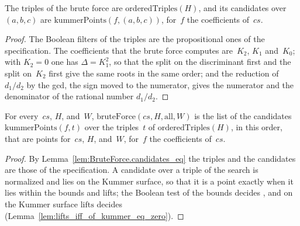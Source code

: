 \begin{lemma}
  \label{lem:BruteForce.candidates_eq}
  \leanok
  The triples of the brute force are $\mathrm{orderedTriples}(H)$, and its candidates over
  $(a, b, c)$ are $\mathrm{kummerPoints}(f, (a, b, c))$, for~$f$ the coefficients of~$cs$.
\end{lemma}

\begin{proof}\leanok
  The Boolean filters of the triples are the propositional ones of the specification. The
  coefficients that the brute force computes are~$K_2$, $K_1$ and~$K_0$; with $K_2 = 0$ one has
  $\Delta = K_1^2$, so that the split on the discriminant first and the split on~$K_2$ first give
  the same roots in the same order; and the reduction of $d_1/d_2$ by the gcd, the sign moved to
  the numerator, gives the numerator and the denominator of the rational number $d_1/d_2$.
\end{proof}

\begin{theorem}
  \label{thm:bruteForce_eq_filter_flatMap_kummerPoints}
  \leanok
  For every~$cs$, $H$,  and~$W$, $\mathrm{bruteForce}(cs, H, \mathrm{all}, W)$ is the
  list of the candidates $\mathrm{kummerPoints}(f, t)$ over the triples~$t$ of
  $\mathrm{orderedTriples}(H)$, in this order, that are points for~$cs$, $H$, 
  and~$W$, for~$f$ the coefficients of~$cs$.
\end{theorem}

\begin{proof}\leanok
  By Lemma~\ref{lem:BruteForce.candidates_eq} the triples and the candidates are those of the
  specification. A candidate over a triple of the search is normalized and lies on the Kummer
  surface, so that it is a point exactly when it lies within the bounds and lifts; the Boolean
  test of the bounds decides , and on the Kummer surface $\mathrm{lifts}$
  decides  (Lemma~\ref{lem:lifts_iff_of_kummer_eq_zero}).
\end{proof}

